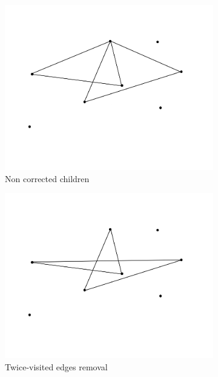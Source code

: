 \begin{figure}[h!]
  \centering
  \begin{subfigure}[b]{0.45\linewidth}
    \includegraphics[width=\linewidth]{media/correction1.png}
     \caption{Non corrected children}
  \end{subfigure}
  \begin{subfigure}[b]{0.45\linewidth}
    \includegraphics[width=\linewidth]{media/correction2.png}
    \caption{Twice-visited edges removal}
  \end{subfigure}
  \begin{subfigure}[b]{0.45\linewidth}

\end{subfigure}
\end{figure}
